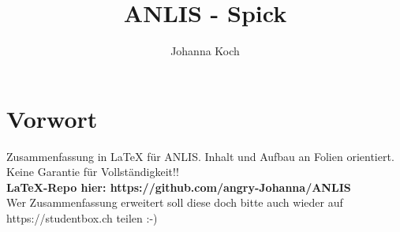 \documentclass{report}
\title{ANLIS - Spick}
\author{Johanna Koch}
\date{ }
\begin{document}
{\selectfont

    \maketitle

    \section*{Vorwort}
    Zusammenfassung in LaTeX für ANLIS. Inhalt und Aufbau an Folien orientiert. Keine Garantie für Vollständigkeit!! \\ [14pt]
    \textbf{LaTeX-Repo hier: https://github.com/angry-Johanna/ANLIS} \\ [14pt]
    Wer Zusammenfassung erweitert soll diese doch bitte auch wieder auf https://studentbox.ch teilen :-)

    \tableofcontents

    

    

    

    

    

    

    

    

    

    

    

    

    

    

    

    
}
\end{document}
